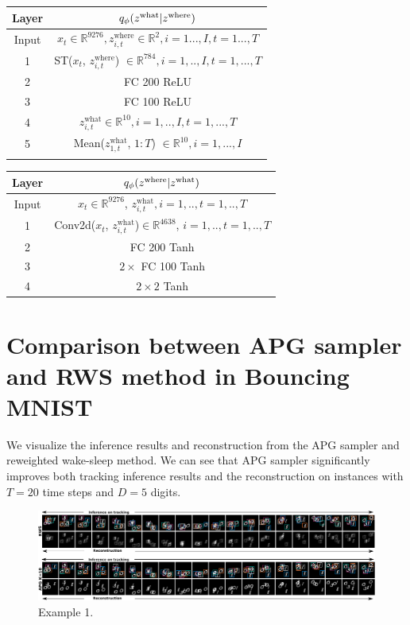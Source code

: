\documentclass{article}
\theoremstyle{definition}
\begin{document}
\begin{table}[h!]
\centering
\begin{tabular}{c|c}
    \toprule
    \textbf{Layer} & $q_\phi(z^{\mathrm{what}} | z^{\mathrm{where}})$ \\
    \midrule
    Input & $x_t\in\mathbb{R}^{9276}, z^{\mathrm{where}}_{i, t}\in\mathbb{R}^{2}, i=1...,I, t=1...,T$
    \\
    \hline
    1 & 
    ST($x_t$, $z^{\mathrm{where}} _{i, t}$) $\in\mathbb{R}^{784}, i=1,..,I, t=1,...,T$  \\
    \hline
    2 &
    FC 200 ReLU \\
    \hline
    3 &
    FC 100 ReLU \\
    \hline
    4 & $z^{\mathrm{what}}_{i, t} \in\mathbb{R}^{10}, i=1,..,I, t=1,...,T$  \\
    \hline
    5 &
    Mean($z^{\mathrm{what}}_{1, t}$, $1:T$) $\in\mathbb{R}^{10}, i=1,...,I$\\
    \bottomrule
    \label{arch-bmnist-enc-what}
\end{tabular}
\end{table}

\begin{table}[h!]
    \centering
    \begin{tabular}{c|c}
     \toprule
    \textbf{Layer} & $q_\phi(z^{\mathrm{where}} | z^{\mathrm{what}})$ \\
    \midrule
    Input &
    $x_t\in\mathbb{R}^{9276}$, $z^{\mathrm{what}}_{i, t}, i=1,.., t=1,..,T$ \\
    \hline
    1 & 
    Conv2d($x_t$, $z^{\mathrm{what}}_{i, t}$)$\in\mathbb{R}^{4638}$, $i=1,.., t=1,..,T$ \\
    \hline
    2  &
    FC 200 Tanh \\
    \hline
    3 & $2\times$ FC 100 Tanh \\
    \hline
    4 &
    $2\times2$ Tanh 
    \\
    \bottomrule
    \end{tabular}
    \label{arch-bmnist-enc-where}
\end{table}
\newpage
\section{Comparison between APG sampler and RWS method in Bouncing MNIST}
\label{appendix:bmnist-comparison-rws}
We visualize the inference results and reconstruction from the APG sampler and reweighted wake-sleep method. We can see that APG sampler significantly improves both tracking inference results and the reconstruction on instances with $T=20$ time steps and $D=5$ digits. 
\begin{figure}[h!]
\centering
\includegraphics[width=150mm]{figures/bmnist-5digits-samples-with-rws-2.pdf}
\caption{Example 1.}
\end{figure}
\end{document}
